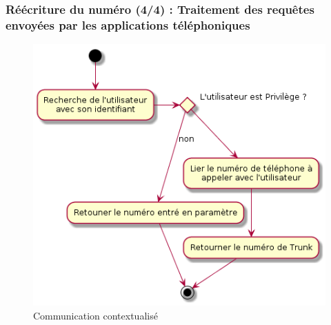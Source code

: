 \begin{frame}
	\frametitle{Réécriture du numéro (4/4) : Traitement des requêtes envoyées par les applications téléphoniques}

	\begin{center}
	  \begin{figure}
        \includegraphics[scale=0.30]{images/activity_rewrite_app.png}
	   \caption{Communication contextualisé}
	  \end{figure}
	\end{center}
\end{frame}